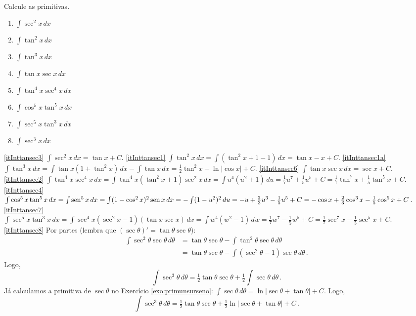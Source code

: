 \begin{exo}\label{Exo:PrimitTangSec}
Calcule as primitivas.
\begin{multicols}{3}
\begin{enumerate}
\item\label{itInttansec3} $\int \sec^2x\,dx$
\item\label{itInttansec1} $\int\tan^2x \,dx$
\item\label{itInttansec1a} $\int\tan^3x \,dx$
\item\label{itInttansec6} $\int \tan x\sec x\,dx$
\item\label{itInttansec2} $\int\tan^4 x\sec^4x\,dx$
\item\label{itInttansec4} $\int \cos^5x\tan^5x\,dx$
\item\label{itInttansec7} $\int \sec^5x\tan^3x\,dx$
\item\label{itInttansec8} $\int \sec^3x\,dx$
\end{enumerate}
\end{multicols}
\vspace{0.01cm}
\begin{sol}
\eqref{itInttansec3} $\int \sec^2x\,dx=\tan x+C$.
\eqref{itInttansec1} $\int\tan^2x \,dx=\int(\tan^2x+1-1)\,dx=\tan x-x+C$.
\eqref{itInttansec1a} $\int\tan^3x \,dx=\int\tan x(1+\tan^2x)\,dx-\int \tan x\,dx=\tfrac12\tan^2 x-\ln
|\cos x|+C$.
\eqref{itInttansec6} $\int \tan x\sec x\,dx=\sec x+C$.
\eqref{itInttansec2} $\int\tan^4 x\sec^4x\,dx=\int
\tan^4x(\tan^2x+1)\sec^2x\,dx=\int u^4(u^2+1)\,du=
\tfrac17u^7+\tfrac15u^5+C=\tfrac17\tan^7x+\tfrac15\tan^5x+C$.
\eqref{itInttansec4} $\int\cos^5x\tan^5x\,dx=\int
\operatorname{sen}^5x\,dx=\int(1-\cos^2x)^2\operatorname{sen} x\,dx=
-\int(1-u^2)^2\,du=-u+\tfrac23u^3-\tfrac15 u^5+C=
-\cos x+\tfrac23\cos^3x-\tfrac15 \cos^5x+C$.
\eqref{itInttansec7} $\int \sec^5x\tan^3x\,dx=\int \sec^4x(\sec^2x-1)(\tan x\sec
x)\,dx=\int w^4(w^2-1)\,dw=\tfrac17 w^7-\tfrac15 w^5+C=\tfrac17 \sec^7x-\tfrac15
\sec^5x+C$.
\eqref{itInttansec8} Por partes (lembra que
$(\sec\theta)'=\tan\theta\sec\theta$):
\begin{align*}
 \int\sec^2\theta\sec\theta\,d\theta
&=\tan \theta\sec\theta-\int\tan^2\theta\sec\theta\,d\theta\\
&=\tan \theta\sec\theta-\int(\sec^2\theta-1)\sec\theta\,d\theta\,.
\end{align*}
Logo,
$$
\int\sec^3\theta\,d\theta=
\tfrac12\tan\theta\sec\theta+\tfrac12\int\sec\theta\,d\theta\,.
$$
Já calculamos a primitiva de $\sec \theta$ no Exercício
\ref{exo:primunsurseno}: 
$\int\sec\theta\,d\theta=\ln\bigl|\sec\theta+\tan \theta\bigr|+C$. Logo,
$$
\int\sec^3\theta\,d\theta=
\tfrac12\tan\theta\sec\theta+\tfrac12\ln\bigl|\sec\theta+\tan \theta\bigr|+C\,.
$$
\end{sol}
\end{exo}

